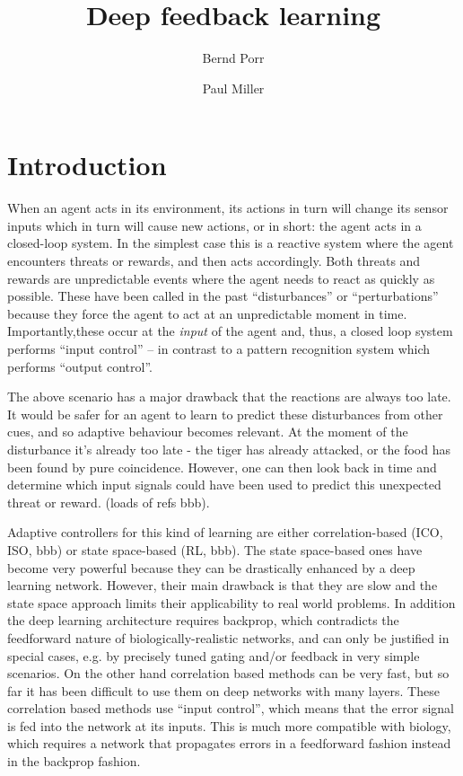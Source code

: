 \documentclass{llncs}
\title{Deep feedback learning}
\author{Bernd Porr \and Paul Miller}
\institute{Glasgow Neuro, bernd,paul@glasgowneuro.tech}
\begin{document}
\maketitle

\begin{abstract}
\end{abstract}

\section{Introduction}
When an agent acts in its environment, its actions in turn will
change its sensor inputs which in turn will cause new actions, or in
short: the agent acts in a closed-loop system. In the simplest case this
is a reactive system where the agent encounters threats or rewards, and
then acts accordingly. Both threats and rewards are unpredictable events
where the agent needs to react as quickly as possible. These have been
called in the past ``disturbances'' or ``perturbations'' because they force
the agent to act at an unpredictable moment in time. Importantly,these
occur at the \textsl{input} of the agent and, thus, a closed loop system
performs ``input control'' -- in contrast to a pattern recognition system
which performs ``output control''.

The above scenario has a major drawback that the reactions are always too late.
It would be safer for an agent to learn to predict these disturbances from other cues, and so adaptive behaviour becomes relevant. At the moment of the disturbance it's already too late - the tiger has already attacked, or the food has been found by pure coincidence. However, one can then look back in time and determine which input signals could have been used to predict this unexpected threat or reward. (loads of refs bbb). 

Adaptive controllers for this kind of learning are either correlation-based (ICO, ISO, bbb)
or state space-based (RL, bbb). The state space-based
ones have become very powerful because they can be drastically enhanced
by a deep learning network. However, their main drawback is that they are slow
and the state space approach limits their applicability to real
world problems. In addition the deep learning architecture requires backprop,
which contradicts the feedforward nature of biologically-realistic networks,
and can only be justified in special cases, e.g. by precisely tuned gating and/or
feedback in very simple scenarios. On the other hand correlation based methods can be very fast, but so far it has been difficult to use them on deep networks with many layers.
These correlation based methods use ``input control'', which means that the
error signal is fed into the network at its inputs. This is much more compatible
with biology, which requires a network that propagates errors in a feedforward
fashion instead in the backprop fashion.
\end{document}
